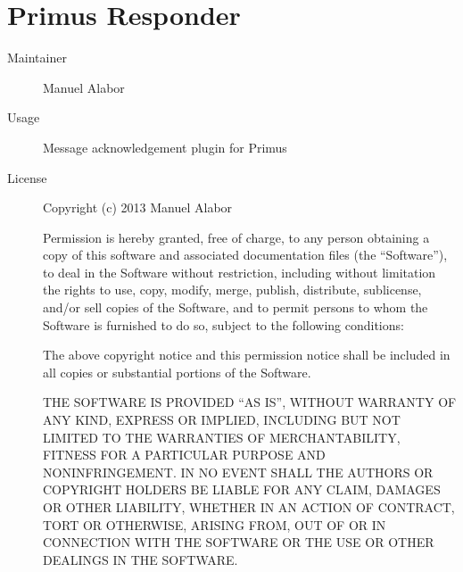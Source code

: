   \section*{Primus Responder}
    \begin{description}
      \item[Maintainer] Manuel Alabor
      \item[Usage] Message acknowledgement plugin for Primus
      \item[License] \scriptsize Copyright (c) 2013 Manuel Alabor

        Permission is hereby granted, free of charge, to any person obtaining a copy of this software and associated documentation files (the ``Software''), to deal in the Software without restriction, including without limitation the rights to use, copy, modify, merge, publish, distribute, sublicense, and/or sell copies of the Software, and to permit persons to whom the Software is furnished to do so, subject to the following conditions:

        The above copyright notice and this permission notice shall be included in all copies or substantial portions of the Software.

        THE SOFTWARE IS PROVIDED ``AS IS'', WITHOUT WARRANTY OF ANY KIND, EXPRESS OR IMPLIED, INCLUDING BUT NOT LIMITED TO THE WARRANTIES OF MERCHANTABILITY, FITNESS FOR A PARTICULAR PURPOSE AND NONINFRINGEMENT. IN NO EVENT SHALL THE AUTHORS OR COPYRIGHT HOLDERS BE LIABLE FOR ANY CLAIM, DAMAGES OR OTHER LIABILITY, WHETHER IN AN ACTION OF CONTRACT, TORT OR OTHERWISE, ARISING FROM, OUT OF OR IN CONNECTION WITH THE SOFTWARE OR THE USE OR OTHER DEALINGS IN THE SOFTWARE.
    \end{description}

